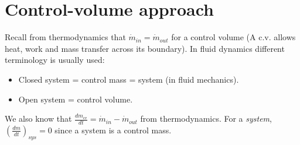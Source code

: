 \documentclass[class=report, crop=false, 12pt,a4paper]{standalone}
\begin{document}
\section{Control-volume approach}
Recall from thermodynamics that \(\dot{m}_{in} = \dot{m}_{out}\) for a control volume (A c.v. allows heat, work and mass transfer across its boundary). In fluid dynamics different terminology is usually used:
\begin{itemize}[noitemsep]
  \item Closed system = control mass = system (in fluid mechanics).
  \item Open system = control volume.
\end{itemize}
We also know that \(\frac{dm_{cv}}{dt} = \dot{m}_{in} - \dot{m}_{out} \) from thermodynamics. For a \emph{system}, \( \left( \frac{dm}{dt} \right)_{sys} = 0\) since a system is a control mass. 
\end{document}
